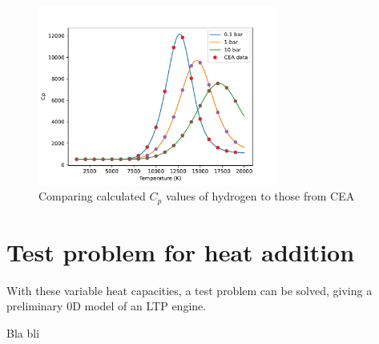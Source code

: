         \begin{figure}[!ht]
            \centering
            \includegraphics[width=0.7\textwidth]{assets/2 models/Cp_compare.pdf}
            \caption{Comparing calculated $C_p$ values of hydrogen to those from CEA}
            \label{fig:Cp_compare}
        \end{figure}


    \section{Test problem for heat addition}

        With these variable heat capacities, a test problem can be solved, giving a preliminary 0D model of an LTP engine.

        Bla bli 